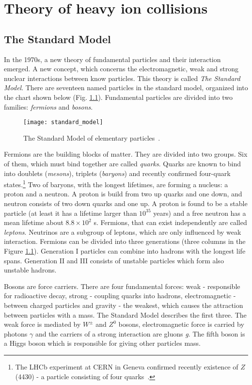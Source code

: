 \chapter{Theory of heavy ion collisions}
  \section{The Standard Model}
    In the 1970s, a new theory of fundamental particles and their interaction emerged.
    A new concept, which concerns the electromagnetic, weak and strong nuclear interactions between know particles.
    This theory is called \textit{The Standard Model}.
    There are seventeen named particles in the standard model, organized into the chart shown below (Fig. \ref{fig:standard_model}).
    Fundamental particles are divided into two families: \textit{fermions} and \textit{bosons}.
     \begin{figure}[h]
       \centering
       \texttt{[image: standard\_model]}
       \caption{The Standard Model of elementary particles~\cite{sm_svg}.}
       \label{fig:standard_model}
     \end{figure}
     
    Fermions are the building blocks of matter.
    They are divided into two groups.
    Six of them, which must bind together are called \textit{quarks}.
    Quarks are known to bind into doublets (\textit{mesons}), triplets (\textit{baryons}) and recently confirmed four-quark states.\footnote{The LHCb experiment at CERN in Geneva confirmed recently existence of $Z$(4430) - a particle consisting of four quarks~\cite{fourquark}.}
    Two of baryons, with the longest lifetimes, are forming a nucleus: a proton and a neutron.
    A proton is build from two up quarks and one down, and neutron consists of two down quarks and one up.
    A proton is found to be a stable particle (at least it has a lifetime larger than $10^{35}$ years) and a free neutron has a mean lifetime about $8.8\times10^2$ s.
    Fermions, that can exist independently are called \textit{leptons}.
    Neutrinos are a subgroup of leptons, which are only influenced by weak interaction.
    Fermions can be divided into three generations (three columns in the Figure \ref{fig:standard_model}).
    Generation I particles can combine into hadrons with the longest life spans. 
    Generation II and III consists of unstable particles which form also unstable hadrons. 
    
    Bosons are force carriers.
    There are four fundamental forces: weak - responsible for radioactive decay, strong - coupling quarks into hadrons, electromagnetic - between charged particles and gravity - the weakest, which causes the attraction between particles with a mass.
    The Standard Model describes the first three.
    The weak force is mediated by $W^{\pm}$ and $Z^0$ bosons, electromagnetic force is carried by photons $\gamma$ and the carriers of a strong interaction are gluons \textit{g}.
    The fifth boson is a Higgs boson which is responsible for giving other particles mass. 
 

